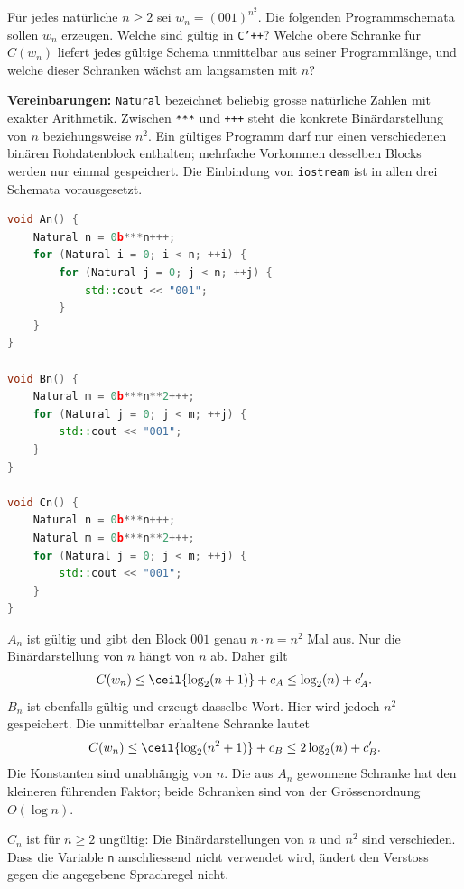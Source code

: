 \begin{questions}
	\clearpage
	\question[3]
	Für jedes natürliche $n\geq2$ sei $w_n=(001)^{n^2}$. Die folgenden Programmschemata sollen $w_n$ erzeugen. Welche sind gültig in \texttt{C'++}? Welche obere Schranke für $C(w_n)$ liefert jedes gültige Schema unmittelbar aus seiner Programmlänge, und welche dieser Schranken wächst am langsamsten mit $n$?

	\textbf{Vereinbarungen:} \texttt{Natural} bezeichnet beliebig grosse natürliche Zahlen mit exakter Arithmetik. Zwischen \texttt{***} und \texttt{+++} steht die konkrete Binärdarstellung von $n$ beziehungsweise $n^2$. Ein gültiges Programm darf nur einen verschiedenen binären Rohdatenblock enthalten; mehrfache Vorkommen desselben Blocks werden nur einmal gespeichert. Die Einbindung von \texttt{iostream} ist in allen drei Schemata vorausgesetzt.
	\begin{lstlisting}[language=C++,basicstyle=\ttfamily\small]
void An() {
    Natural n = 0b***n+++;
    for (Natural i = 0; i < n; ++i) {
        for (Natural j = 0; j < n; ++j) {
            std::cout << "001";
        }
    }
}

void Bn() {
    Natural m = 0b***n**2+++;
    for (Natural j = 0; j < m; ++j) {
        std::cout << "001";
    }
}

void Cn() {
    Natural n = 0b***n+++;
    Natural m = 0b***n**2+++;
    for (Natural j = 0; j < m; ++j) {
        std::cout << "001";
    }
}
	\end{lstlisting}
	\begin{solution}
		$A_n$ ist gültig und gibt den Block $001$ genau $n\cdot n=n^2$ Mal aus. Nur die Binärdarstellung von $n$ hängt von $n$ ab. Daher gilt
		\begin{align*}
			C(w_n)\leq\ceil{\log_2(n+1)}+c_A\leq\log_2(n)+c'_A.
		\end{align*}
		$B_n$ ist ebenfalls gültig und erzeugt dasselbe Wort. Hier wird jedoch $n^2$ gespeichert. Die unmittelbar erhaltene Schranke lautet
		\begin{align*}
			C(w_n)\leq\ceil{\log_2(n^2+1)}+c_B\leq2\log_2(n)+c'_B.
		\end{align*}
		Die Konstanten sind unabhängig von $n$. Die aus $A_n$ gewonnene Schranke hat den kleineren führenden Faktor; beide Schranken sind von der Grössenordnung $O(\log n)$.

		$C_n$ ist für $n\geq2$ ungültig: Die Binärdarstellungen von $n$ und $n^2$ sind verschieden. Dass die Variable \texttt{n} anschliessend nicht verwendet wird, ändert den Verstoss gegen die angegebene Sprachregel nicht.


\end{solution}
\end{questions}
